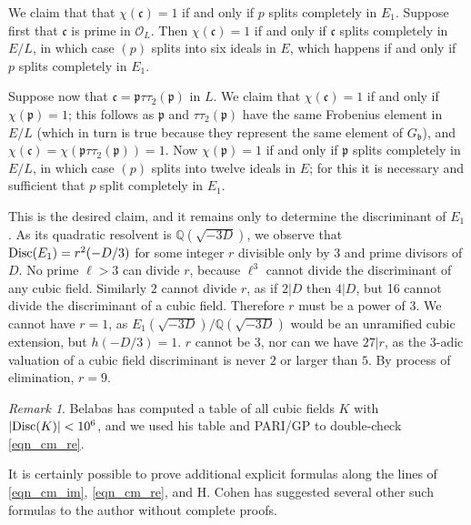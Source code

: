 \documentclass[12pt]{amsart}
\theoremstyle{remark}
\newtheorem*{remark}{Remark}
\numberwithin{theorem}{section} \numberwithin{equation}{section}
\newcommand{\calO}{\mathcal{O}}
\newcommand{\mfp}{\mathfrak{p}}
\newcommand{\mfb}{\mathfrak{b}}
\newcommand{\mfc}{\mathfrak{c}}
\newcommand{\Q}{\mathbb{Q}}
\newcommand{\Disc}{\textnormal{Disc}}
\begin{document}
We claim that that $\chi(\mfc) = 1$ if and only if $p$ splits completely in $E_1$. Suppose first that
$\mfc$ is prime in $\calO_L$. Then $\chi(\mfc) = 1$ if and only if $\mfc$ splits completely in
$E/L$, in which case $(p)$ splits into six ideals in $E$, which happens
if and only if $p$ splits completely
in $E_1$.

Suppose now that $\mfc = \mfp \tau \tau_2(\mfp)$ in $L$. We claim that $\chi(\mfc) = 1$ if and only if
$\chi(\mfp) = 1$; this follows 
as $\mfp$ and $\tau \tau_2(\mfp)$ have the same Frobenius element in $E/L$ (which in turn is true because
they represent the same element of $G_{\mfb}$), and $\chi(\mfc) = \chi(\mfp \tau \tau_2(\mfp)) = 1$.
Now $\chi(\mfp) = 1$ if and only if $\mfp$ splits completely in $E/L$, in which case $(p)$ splits into twelve ideals
in $E$; for this it is necessary and sufficient that $p$ split completely in $E_1$.

This is the desired claim, and it remains only to determine the discriminant of $E_1$. As its quadratic resolvent is
$\Q(\sqrt{-3D})$, we observe that  $\Disc(E_1) = r^2 (-D/3)$ for some integer $r$ divisible only by $3$ and prime divisors of $D$.
No prime $\ell > 3$ can divide $r$, because $\ell^3$ cannot divide the discriminant of any cubic field. Similarly $2$
cannot divide $r$, as if $2 | D$ then $4 | D$, but 16 cannot divide the discriminant of a cubic field. Therefore $r$ must
be a power of 3. We cannot have $r = 1$, as $E_1(\sqrt{-3D})/\Q(\sqrt{-3D})$ would be an unramified cubic extension,
but $h(-D/3) = 1$. $r$ cannot be $3$, nor can we have $27 | r$, as the $3$-adic valuation of a cubic field discriminant
is never $2$ or larger than $5$. By process of elimination, $r = 9$.

\begin{remark}
Belabas \cite{bel} has computed a table of all cubic fields $K$ with $|\Disc(K)| < 10^6$, and
we used his table and PARI/GP \cite{pari} to double-check \eqref{eqn_cm_re}. 

It is certainly possible to prove additional explicit formulas along the lines of \eqref{eqn_cm_im}, \eqref{eqn_cm_re},
and H. Cohen \cite{cohen} has suggested several other such formulas to the author without complete proofs.
\end{remark}
\end{document}
